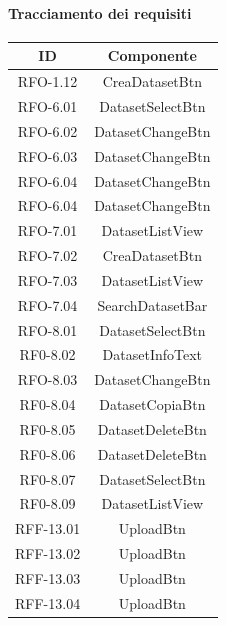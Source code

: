\paragraph{Tracciamento dei requisiti}
\begin{tabularx}{\textwidth}{|c|c|}
    \hline
    \textbf{ID} & \textbf{Componente} \\
    \hline
        RFO-1.12 & CreaDatasetBtn\\
    \hline
        RFO-6.01 & DatasetSelectBtn\\
    \hline
        RFO-6.02 & DatasetChangeBtn\\
    \hline
        RFO-6.03 & DatasetChangeBtn\\
    \hline
        RFO-6.04 & DatasetChangeBtn\\
    \hline
        RFO-6.04 & DatasetChangeBtn\\
    \hline
        RFO-7.01 & DatasetListView\\
    \hline
        RFO-7.02 & CreaDatasetBtn\\
    \hline
        RFO-7.03 & DatasetListView\\
    \hline
        RFO-7.04 & SearchDatasetBar\\
    \hline
        RFO-8.01 & DatasetSelectBtn\\
    \hline
        RF0-8.02 & DatasetInfoText\\
    \hline
        RFO-8.03 & DatasetChangeBtn\\
    \hline
        RF0-8.04 & DatasetCopiaBtn\\
    \hline
        RF0-8.05 & DatasetDeleteBtn\\
    \hline
        RF0-8.06 & DatasetDeleteBtn\\
    \hline
        RF0-8.07 & DatasetSelectBtn\\
    \hline
        RF0-8.09 & DatasetListView\\
    \hline
        RFF-13.01 & UploadBtn\\
    \hline
        RFF-13.02 & UploadBtn\\
    \hline
        RFF-13.03 & UploadBtn\\
    \hline
        RFF-13.04 & UploadBtn\\
    \hline
\end{tabularx}